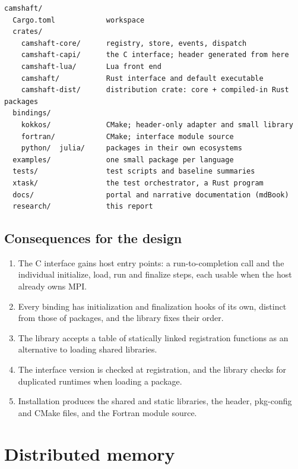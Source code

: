 \documentclass[11pt,a4paper]{article}
\begin{document}
\begin{lstlisting}
camshaft/
  Cargo.toml            workspace
  crates/
    camshaft-core/      registry, store, events, dispatch
    camshaft-capi/      the C interface; header generated from here
    camshaft-lua/       Lua front end
    camshaft/           Rust interface and default executable
    camshaft-dist/      distribution crate: core + compiled-in Rust packages
  bindings/
    kokkos/             CMake; header-only adapter and small library
    fortran/            CMake; interface module source
    python/  julia/     packages in their own ecosystems
  examples/             one small package per language
  tests/                test scripts and baseline summaries
  xtask/                the test orchestrator, a Rust program
  docs/                 portal and narrative documentation (mdBook)
  research/             this report
\end{lstlisting}

\subsection{Consequences for the design}

\begin{enumerate}
  \item The C interface gains host entry points: a run-to-completion call
        and the individual initialize, load, run and finalize steps, each
        usable when the host already owns MPI.
  \item Every binding has initialization and finalization hooks of its own,
        distinct from those of packages, and the library fixes their order.
  \item The library accepts a table of statically linked registration
        functions as an alternative to loading shared libraries.
  \item The interface version is checked at registration, and the library
        checks for duplicated runtimes when loading a package.
  \item Installation produces the shared and static libraries, the header,
        pkg-config and CMake files, and the Fortran module source.
\end{enumerate}

\section{Distributed memory}
\label{sec:mpi}
\end{document}
